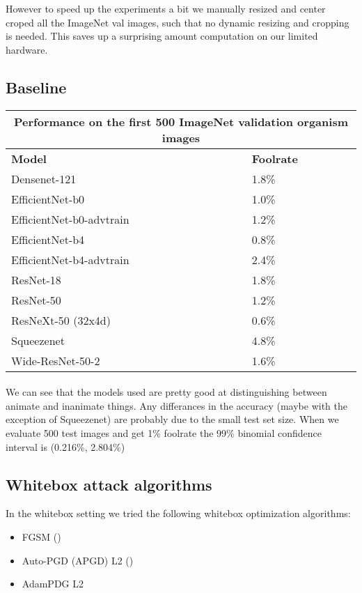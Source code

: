 However to speed up the experiments a bit we manually resized and center croped all the ImageNet val images, such that no dynamic resizing and cropping is needed. This saves up a surprising amount computation on our limited hardware.


\subsection{Baseline}
\begin{tabular}{ ||p{5cm}|p{3cm}|| }
  \hline
     \multicolumn{2}{|c|}{Performance on the first 500 ImageNet validation organism images} \\
 \hline
 \textbf{Model} & \textbf{Foolrate} \\
 \hline
 \hline
 Densenet-121 & 1.8\%  \\
 \hline
 EfficientNet-b0 & 1.0\% \\
 \hline
 EfficientNet-b0-advtrain & 1.2\% \\
 \hline
 EfficientNet-b4 & 0.8\% \\
 \hline
 EfficientNet-b4-advtrain & 2.4\% \\
 \hline
 ResNet-18 & 1.8\% \\
 \hline
 ResNet-50 & 1.2\% \\
 \hline
 ResNeXt-50 (32x4d) & 0.6\% \\
 \hline
 Squeezenet & 4.8\% \\
 \hline
 Wide-ResNet-50-2 & 1.6\% \\
 \hline
\end{tabular}

\paragraph{}
We can see that the models used are pretty good at distinguishing between animate and inanimate things. Any differances in the accuracy (maybe with the exception of Squeezenet) are probably due to the small test set size. When we evaluate 500 test images and get 1\% foolrate the 99\% binomial confidence interval is (0.216\%, 2.804\%)

\subsection{Whitebox attack algorithms}
In the whitebox setting we tried the following whitebox optimization algorithms:

\begin{itemize}
    \item FGSM (\cite{goodfellow2015explaining})
    \item Auto-PGD (APGD) L2 (\cite{croce2020reliable})
    \item AdamPDG L2
\end{itemize}


